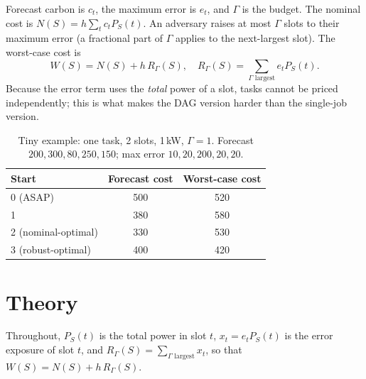 \documentclass[conference,11pt]{IEEEtran}
\theoremstyle{definition}\newtheorem{remark}{Remark}
\newcommand{\Gm}{\Gamma}
\begin{document}
Forecast carbon is $c_t$, the maximum error is $e_t$, and $\Gm$ is the budget. The nominal cost is $N(S)=h\sum_t c_tP_S(t)$. An adversary raises at most $\Gm$ slots to their maximum error (a fractional part of $\Gm$ applies to the next-largest slot). The worst-case cost is
\begin{equation}
W(S)=N(S)+h\,R_\Gm(S),\quad R_\Gm(S)=\sum_{\text{$\Gm$ largest}} e_tP_S(t).
\end{equation}
Because the error term uses the \emph{total} power of a slot, tasks cannot be priced independently; this is what makes the DAG version harder than the single-job version.

\begin{table}[t]\centering\caption{Tiny example: one task, 2 slots, 1\,kW, $\Gm=1$. Forecast $200,300,80,250,150$; max error $10,20,200,20,20$.}\label{tab:tiny}
\begin{tabular}{lcc}\toprule Start & Forecast cost & Worst-case cost\\\midrule
0 (ASAP) & 500 & 520\\ 1 & 380 & 580\\ 2 (nominal-optimal) & 330 & 530\\ 3 (robust-optimal) & 400 & 420\\\bottomrule\end{tabular}\end{table}

\section{Theory}\label{sec:theory}
Throughout, $P_S(t)$ is the total power in slot $t$, $x_t=e_tP_S(t)$ is the error exposure of slot $t$, and $R_\Gamma(S)=\sum_{\Gamma\text{ largest}}x_t$, so that $W(S)=N(S)+h\,R_\Gamma(S)$.
\end{document}
